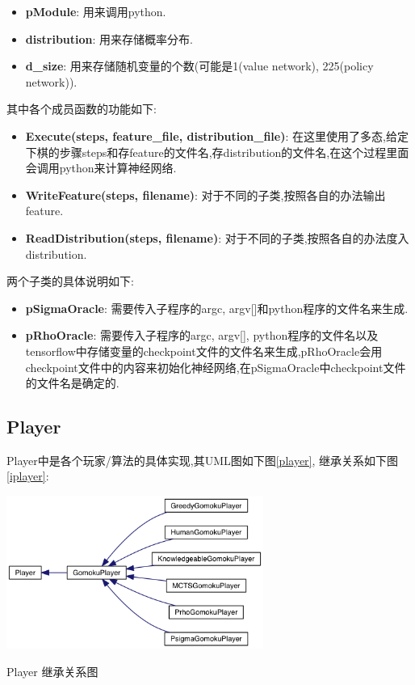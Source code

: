 \documentclass[twocolumn]{article}
\begin{document}
\begin{itemize}
	\item \textbf{pModule}: 用来调用python.
	\item \textbf{distribution}: 用来存储概率分布.
	\item \textbf{d\_size}: 用来存储随机变量的个数(可能是1(value network), 225(policy network)).
\end{itemize}

其中各个成员函数的功能如下:

\begin{itemize}
	\item \textbf{Execute(steps, feature\_file, distribution\_file)}: 在这里使用了多态,给定下棋的步骤steps和存feature的文件名,存distribution的文件名,在这个过程里面会调用python来计算神经网络.
	\item \textbf{WriteFeature(steps, filename)}: 对于不同的子类,按照各自的办法输出feature.
	\item \textbf{ReadDistribution(steps, filename)}: 对于不同的子类,按照各自的办法度入distribution.
\end{itemize}

两个子类的具体说明如下: 

\begin{itemize}
	\item \textbf{pSigmaOracle}: 需要传入子程序的argc, argv[]和python程序的文件名来生成.
	\item \textbf{pRhoOracle}: 需要传入子程序的argc, argv[], python程序的文件名以及tensorflow中存储变量的checkpoint文件的文件名来生成,pRhoOracle会用checkpoint文件中的内容来初始化神经网络,在pSigmaOracle中checkpoint文件的文件名是确定的.
\end{itemize}

\subsection{Player}

Player中是各个玩家/算法的具体实现,其UML图如下图\ref{player}, 继承关系如下图\ref{iplayer}:

\begin{center}
\makeatletter
\def\@captype{figure}
\makeatother
\includegraphics [height=5cm]{iplayer}
\caption{Player 继承关系图}
\label{iplayer}
\end{center}
\end{document}
